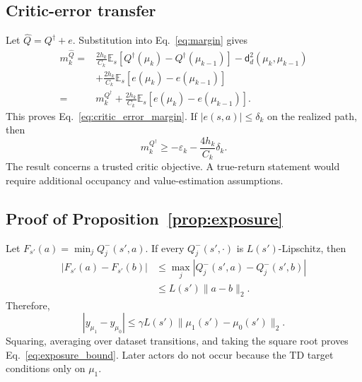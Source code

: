\documentclass[letterpaper]{article}
\begin{document}
\subsection{Critic-error transfer}
Let $\widehat Q=Q^\dagger+e$. Substitution into Eq.~\eqref{eq:margin} gives
\begin{equation}
\begin{split}
m_k^{\widehat Q}
={}&\frac{2h_k}{C_k}\mathbb E_s
 [Q^\dagger(\mu_k)-Q^\dagger(\mu_{k-1})]
 -\mathsf d_d^2(\mu_k,\mu_{k-1})\\
&+\frac{2h_k}{C_k}\mathbb E_s[e(\mu_k)-e(\mu_{k-1})]\\
={}&m_k^{Q^\dagger}
+\frac{2h_k}{C_k}\mathbb E_s[e(\mu_k)-e(\mu_{k-1})].
\end{split}
\end{equation}
This proves Eq.~\eqref{eq:critic_error_margin}. If
$|e(s,a)|\leq\delta_k$ on the realized path, then
\begin{equation}
m_k^{Q^\dagger}\geq-\varepsilon_k-\frac{4h_k}{C_k}\delta_k.
\end{equation}
The result concerns a trusted critic objective. A true-return statement would
require additional occupancy and value-estimation assumptions.

\subsection{Proof of Proposition~\ref{prop:exposure}}
Let $F_{s'}(a)=\min_jQ_j^-(s',a)$. If every
$Q_j^-(s',\cdot)$ is $L(s')$-Lipschitz, then
\begin{equation}
\begin{split}
|F_{s'}(a)-F_{s'}(b)|
&\leq\max_j|Q_j^-(s',a)-Q_j^-(s',b)|\\
&\leq L(s')\|a-b\|_2.
\end{split}
\end{equation}
Therefore,
\begin{equation}
|y_{\mu_1}-y_{\mu_0}|
\leq\gamma L(s')\|\mu_1(s')-\mu_0(s')\|_2.
\end{equation}
Squaring, averaging over dataset transitions, and taking the square root proves
Eq.~\eqref{eq:exposure_bound}. Later actors do not occur because the TD target
conditions only on $\mu_1$.
\end{document}

